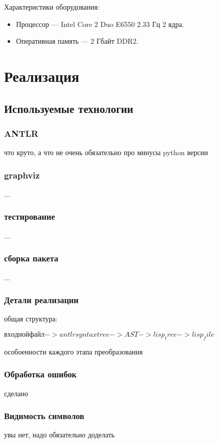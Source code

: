 \documentclass[12pt,a4paper,oneside]{extarticle}
\begin{document}
        \noindent Характеристики оборудования:
        \begin{itemize}
            \item Процессор --- Intel Core 2 Duo E6550 2.33 Гц 2 ядра.
            \item Оперативная память --- 2 Гбайт DDR2.
        \end{itemize}
\clearpage

\section{Реализация}
    \subsection{Используемые технологии}
        \subsubsection{ANTLR}
            что круто, а что не очень
            обязательно про минусы python версии
        \subsubsection{graphviz}
            ...
        \subsubsection{тестирование}
            ...
        \subsubsection{сборка пакета}
            ...

    \subsubsection{Детали реализации}
        общая структура:

        $входной файл -> antlr syntax tree -> AST -> lisp_tree -> lisp_file$

        особоенности каждого этапа преобразования
        \subsubsection{Обработка ошибок}
            сделано
        \subsubsection{Видимость символов}
            увы нет, надо обязательно доделать
        
\end{document}
